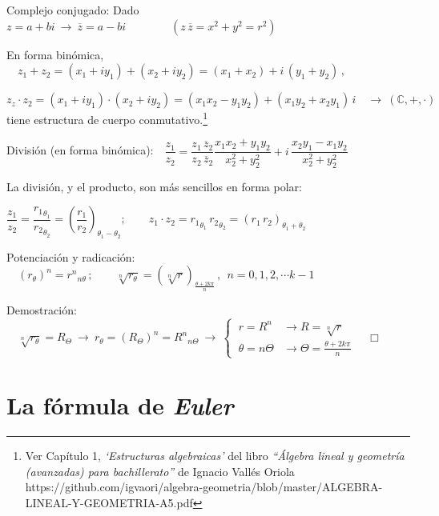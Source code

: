 Complejo conjugado: Dado $z=a+bi \ \to \  \overline z=a-bi\qquad \qquad  (z\, \overline z=x^2+y^2=r^2)$

En forma binómica, $\quad z_1+z_2=(x_1+iy_1)+(x_2+iy_2)=(x_1+x_2)+i\,(y_1+y_2)\, , \ $

$z_z\cdot z_2=(x_1+iy_1)\cdot(x_2+iy_2)=(x_1x_2-y_1y_2)+(x_1y_2+x_2y_1)\, i \quad \rightarrow  \ (\mathbb C,+,\cdot) \ $ tiene estructura de cuerpo conmutativo.\footnote{Ver Capítulo 1, \emph{`Estructuras algebraicas'} del libro \emph{``Álgebra lineal y geometría (avanzadas) para bachillerato''} de \textsf{Ignacio Vallés Oriola} \\ \textcolor{NavyBlue}{https://github.com/igvaori/algebra-geometria/blob/master/ALGEBRA-LINEAL-Y-GEOMETRIA-A5.pdf}}

División (en forma binómica):$\quad \dfrac {z_1} {z_2} = \dfrac{z_1\, \overline z_2}{z_2 \, \overline z_2}\dfrac{x_1x_2+y_1y_2}{x_2^2+y_2^2}+i\, \dfrac{x_2y_1-x_1y_2}{x_2^2+y_2^2}$

La división, y el producto, son más sencillos en forma polar: 

$\dfrac{z_1}{z_2}=\dfrac{{r_1}_{\theta_1}}{{r_2}_{\theta_2}}= \left( \dfrac{r_1}{r_2} \right)_{\theta_1-\theta_2};\qquad z_1\cdot z_2={r_1}_{\theta_1}\,{r_2}_{\theta_2}=(r_1\, r_2)_{\theta_1+\theta_2}$

Potenciación y radicación: $\quad (r_\theta)^n={r^n}_{n\theta}\, ;\qquad  \sqrt[n]{r_\theta}=\left(\sqrt[n]{r} \right)_{ \frac{\theta+2k\pi}{n} } \, , \ \ n=0,1,2,\cdots k-1$

\textcolor{gris}{Demostración:$\quad \sqrt[n]{r_\theta}=R_\Theta \ \to \ r_\theta=\left( R_{\Theta} \right)^n ={R^n}_{n\Theta}\ \to \ \begin{cases} \ r=R^n & \to R=\sqrt[n]{r} \\ \ \theta=n\Theta & \to  \Theta= \frac{\theta+2k\pi}{n} \end{cases} \quad \Box$}


\vspace{1cm}
\section{La fórmula de \emph{Euler}}
\vspace{0.5cm}

